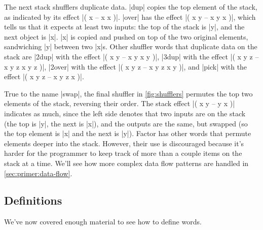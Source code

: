 The next stack shufflers duplicate data.  \factor|dup| copies the top element
of the stack, as indicated by its effect \factor|( x -- x x )|.  \factor|over|
has the effect \factor|( x y -- x y x )|, which tells us that it expects at
least two inputs: the top of the stack is \factor|y|, and the next object is
\factor|x|.  \factor|x| is copied and pushed on top of the two original
elements, sandwiching \factor|y| between two \factor|x|s.  Other shuffler words
that duplicate data on the stack are
%
\factor|2dup| with the effect \factor|( x y -- x y x y )|,
%
\factor|3dup| with the effect \factor|( x y z -- x y z x y z )|,
%
\factor|2over| with the effect \factor|( x y z -- x y z x y )|, and
%
\factor|pick| with the effect \factor|( x y z -- x y z x )|.

True to the name \factor|swap|, the final shuffler in \vref{fig:shufflers}
permutes the top two elements of the stack, reversing their order.  The stack
effect
%
\factor|( x y -- y x )|
%
indicates as much, since the left side denotes that two inputs are on the stack
(the top is \factor|y|, the next is \factor|x|), and the outputs are the same,
but swapped (so the top element is \factor|x| and the next is \factor|y|).
Factor has other words that permute elements deeper into the stack.  However,
their use is discouraged because it's harder for the programmer to keep track
of more than a couple items on the stack at a time.  We'll see how more complex
data flow patterns are handled in \cref{sec:primer:data-flow}.

\subsection{Definitions}

We've now covered enough material to see how to define words.


